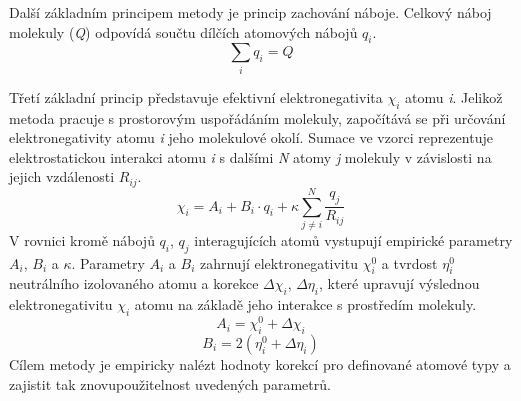 Další základním principem metody je princip zachování náboje. Celkový náboj molekuly (\textit{Q}) odpovídá součtu dílčích atomových nábojů $q_i$.
\begin{equation}
\label{EEM_chargesum}
    \sum_{i} q_i = Q
\end{equation}

Třetí základní princip představuje efektivní elektronegativita $\chi_i$ atomu \textit{i}. Jelikož metoda pracuje s prostorovým uspořádáním molekuly, započítává se při určování elektronegativity atomu \textit{i} jeho molekulové okolí. Sumace ve vzorci reprezentuje elektrostatickou interakci atomu \textit{i} s dalšími \textit{N} atomy \textit{j} molekuly  v závislosti na jejich vzdálenosti $R_{ij}$.
\begin{equation}
\label{EEM_elneg}
    \chi_i = A_i + B_i\cdot q_i + \kappa \sum_{j \neq i}^{N} \frac{q_j}{R_{ij}}
\end{equation}
V rovnici kromě nábojů $q_i$, $q_j$ interagujících atomů vystupují empirické parametry $A_i$, $B_i$ a $\kappa$. Parametry  $A_i$ a $B_i$ zahrnují elektronegativitu $\chi_{i}^{0}$ a tvrdost $\eta_{i}^{0}$ neutrálního izolovaného atomu a korekce $\Delta \chi_i$, $\Delta \eta_i$, které upravují výslednou elektronegativitu $\chi_i$ atomu na základě jeho interakce s prostředím molekuly. 
\begin{equation}
    A_i = \chi_{i}^{0} + \Delta \chi_i
\end{equation}
\begin{equation}
        B_i = 2(\eta_{i}^{0} + \Delta \eta_i)
\end{equation}
Cílem metody je empiricky nalézt hodnoty korekcí pro definované atomové typy a zajistit tak znovupoužitelnost uvedených parametrů. 


